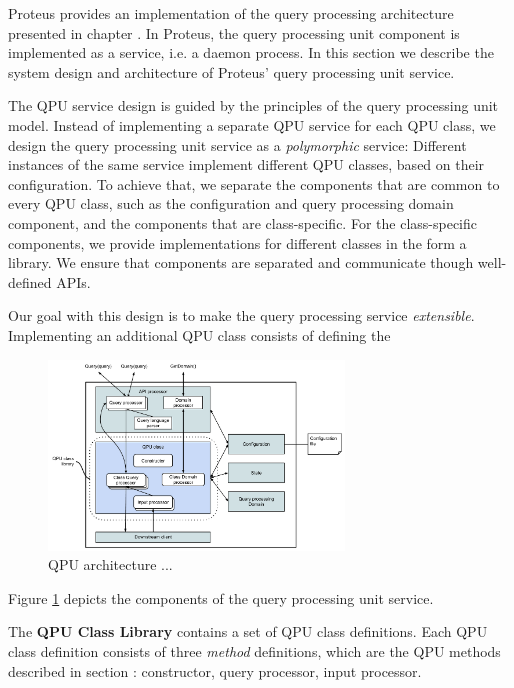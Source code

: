 Proteus provides an implementation of the query processing architecture presented in chapter .
In Proteus, the query processing unit component is implemented as a service, i.e. a daemon process.
In this section we describe the system design and architecture of Proteus' query processing unit service.

\medskip
\noindent
The QPU service design is guided by the principles of the query processing unit model.
Instead of implementing a separate QPU service for each QPU class,
we design the query processing unit service as a \textit{polymorphic} service:
Different instances of the same service implement different QPU classes, based on their configuration.
To achieve that, we separate the components that are common to every QPU class, such as the configuration and query processing domain
component,
and the components that are class-specific.
For the class-specific components, we provide implementations for different classes in the form a library.
We ensure that components are separated and communicate though well-defined APIs.

Our goal with this design is to make the query processing service \textit{extensible}.
Implementing an additional QPU class consists of defining the 

\begin{figure}
  \centering
    \includegraphics[width=0.7\textwidth]{./figures/proteus/QPU_architecture.pdf}
  \caption{QPU architecture  ...}
  \label{fig:qpu_arch}
\end{figure}


\medskip
\noindent
Figure \ref{fig:qpu_arch} depicts the components of the query processing unit service.

The \textbf{QPU Class Library} contains a set of QPU class definitions.
Each QPU class definition consists of three \textit{method} definitions,
which are the QPU methods described in section \todo{}: constructor, query processor, input processor.

